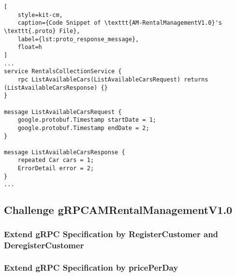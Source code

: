 \begin{lstlisting}[
    style=kit-cm,
    caption={Code Snippet of \texttt{AM-RentalManagementV1.0}'s \texttt{.proto} File},
    label={lst:proto_response_message},
    float=h
]
...
service RentalsCollectionService {
    rpc ListAvailableCars(ListAvailableCarsRequest) returns (ListAvailableCarsResponse) {}
}

message ListAvailableCarsRequest {  
    google.protobuf.Timestamp startDate = 1;
    google.protobuf.Timestamp endDate = 2;
}

message ListAvailableCarsResponse {
    repeated Car cars = 1;
    ErrorDetail error = 2;
}
...
\end{lstlisting}

\subsection{Challenge gRPCAMRentalManagementV1.0}
\subsubsection*{Extend gRPC Specification by RegisterCustomer and DeregisterCustomer}
\subsubsection*{Extend gRPC Specification by pricePerDay}


